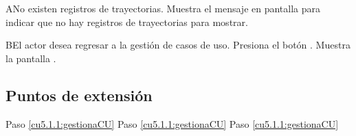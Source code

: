  \begin{UCtrayectoriaA}{A}{No existen registros de trayectorias.}
    \UCpaso[\UCsist] Muestra el mensaje  en pantalla  
    para indicar que no hay registros de trayectorias para mostrar.
 \end{UCtrayectoriaA}
 
 \begin{UCtrayectoriaA}{B}{El actor desea regresar a la gestión de casos de uso.}
    \UCpaso[\UCactor] Presiona el botón .
    \UCpaso[\UCsist] Muestra la pantalla .
 \end{UCtrayectoriaA}
 
\subsection{Puntos de extensión}

	{Paso \ref{cu5.1.1:gestionaCU}}
	{}
	{Paso \ref{cu5.1.1:gestionaCU}}
	{}
	{Paso \ref{cu5.1.1:gestionaCU}}
	{}
  